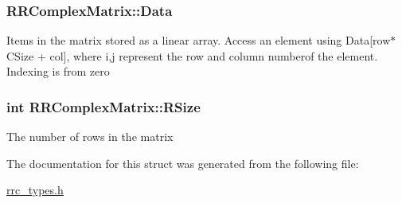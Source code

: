 \subsubsection[{Data}]{ R\+R\+Complex\+Matrix\+::\+Data}\label{struct_r_r_complex_matrix_ade1afed558e746cb1f1c375ed3b8240a}
Items in the matrix stored as a linear array. Access an element using Data\mbox{[}row$\ast$\+C\+Size + col\mbox{]}, where i,j represent the row and column numberof the element. Indexing is from zero \hypertarget{struct_r_r_complex_matrix_ad576272aa8a6bbd752dc3628307f512a}{}
\subsubsection[{R\+Size}]{\setlength{\rightskip}{0pt plus 5cm}int R\+R\+Complex\+Matrix\+::\+R\+Size}\label{struct_r_r_complex_matrix_ad576272aa8a6bbd752dc3628307f512a}
The number of rows in the matrix 

The documentation for this struct was generated from the following file\+:\begin{DoxyCompactItemize}
\item 
\hyperlink{rrc__types_8h}{rrc\+\_\+types.\+h}\end{DoxyCompactItemize}

